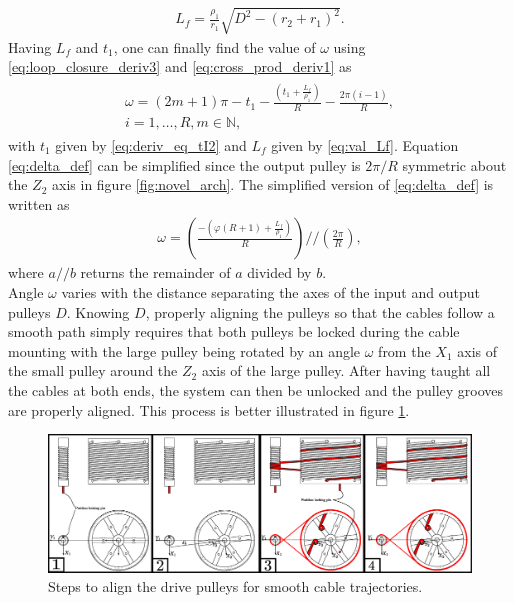 \begin{align}
L_f = \frac{\rho_1}{r_1}\sqrt{D^2-(r_2+r_1)^2}.
\label{eq:val_Lf}
\end{align}
Having $L_f$ and $t_1$, one can finally find the value of $\omega$ using \eqref{eq:loop_closure_deriv3} and \eqref{eq:cross_prod_deriv1} as 
\begin{align}
\begin{multlined}
\omega = \left(2m+1\right)\pi-t_1-\frac{\left(t_1+\frac{L_f}{\rho_1}\right)}{R}-\frac{2\pi(i-1)}{R},\\ i=1 ,\ldots , R, m \in \mathbb{N},
\label{eq:delta_def}
\end{multlined}
\end{align}
with $t_1$ given by \eqref{eq:deriv_eq_tI2} and $L_f$ given by \eqref{eq:val_Lf}. Equation \eqref{eq:delta_def} can be simplified since the output pulley is $2\pi/R$ symmetric about the $Z_2$ axis in figure \ref{fig:novel_arch}. The simplified version of \eqref{eq:delta_def} is written as
\begin{align}
\omega = \left(\frac{-\left(\varphi\left(R+1\right)+\frac{L_f}{\rho_1}\right)}{R}\right)//\left(\frac{2\pi}{R}\right),
\end{align}
where $a//b$ returns the remainder of $a$ divided by $b$.\\

Angle $\omega$ varies with the distance separating the axes of the input and output pulleys $D$. Knowing $D$, properly aligning the pulleys so that the cables follow a smooth path simply requires that both pulleys be locked during the cable mounting with the large pulley being rotated by an angle $\omega$ from the $X_1$ axis of the small pulley around the $Z_2$ axis of the large pulley. After having taught all the cables at both ends, the system can then be unlocked and the pulley grooves are properly aligned. This process is better illustrated in figure \ref{fig:process_align}.
\begin{figure}
\centering
\includegraphics[width = \textwidth]{steps.eps}
\caption{Steps to align the drive pulleys for smooth cable trajectories.}
\label{fig:process_align}
\end{figure}
